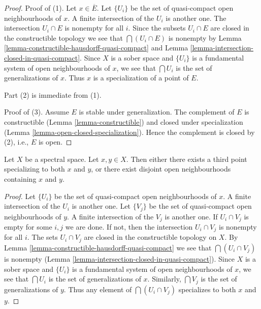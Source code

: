 \begin{proof}
Proof of (1). Let $x \in \overline{E}$. Let $\{U_i\}$ be the set of
quasi-compact open neighbourhoods of $x$. A finite intersection of the
$U_i$ is another one. The intersection $U_i \cap E$ is nonempty for all
$i$. Since the subsets $U_i \cap E$ are closed in the constructible topology
we see that $\bigcap (U_i \cap E)$ is nonempty by
Lemma \ref{lemma-constructible-hausdorff-quasi-compact} and
Lemma \ref{lemma-intersection-closed-in-quasi-compact}.
Since $X$ is a sober space and $\{U_i\}$ is a
fundamental system of open neighbourhoods of $x$, we see that
$\bigcap U_i$ is the set of generalizations of $x$. Thus
$x$ is a specialization of a point of $E$.

\medskip\noindent
Part (2) is immediate from (1).

\medskip\noindent
Proof of (3). Assume $E$ is stable under generalization.
The complement of $E$ is constructible (Lemma \ref{lemma-constructible})
and closed under specialization
(Lemma \ref{lemma-open-closed-specialization}).
Hence the complement is closed by (2), i.e., $E$ is open.
\end{proof}

\begin{lemma}
\label{lemma-two-points}
Let $X$ be a spectral space. Let $x, y \in X$. Then either there exists
a third point specializing to both $x$ and $y$, or there exist disjoint
open neighbourhoods containing $x$ and $y$.
\end{lemma}

\begin{proof}
Let $\{U_i\}$ be the set of quasi-compact open neighbourhoods of $x$.
A finite intersection of the $U_i$ is another one.
Let $\{V_j\}$ be the set of quasi-compact open neighbourhoods of $y$.
A finite intersection of the $V_j$ is another one.
If $U_i \cap V_j$ is empty for some $i, j$ we are done.
If not, then the intersection $U_i \cap V_j$ is nonempty
for all $i$. The sets $U_i \cap V_j$ are closed in the constructible
topology on $X$. By
Lemma \ref{lemma-constructible-hausdorff-quasi-compact}
we see that $\bigcap (U_i \cap V_j)$ is nonempty
(Lemma \ref{lemma-intersection-closed-in-quasi-compact}).
Since $X$ is a sober space and $\{U_i\}$ is a
fundamental system of open neighbourhoods of $x$, we see that
$\bigcap U_i$ is the set of generalizations of $x$.
Similarly, $\bigcap V_j$ is the set of generalizations of $y$.
Thus any element of $\bigcap (U_i \cap V_j)$ specializes to both
$x$ and $y$.
\end{proof}

